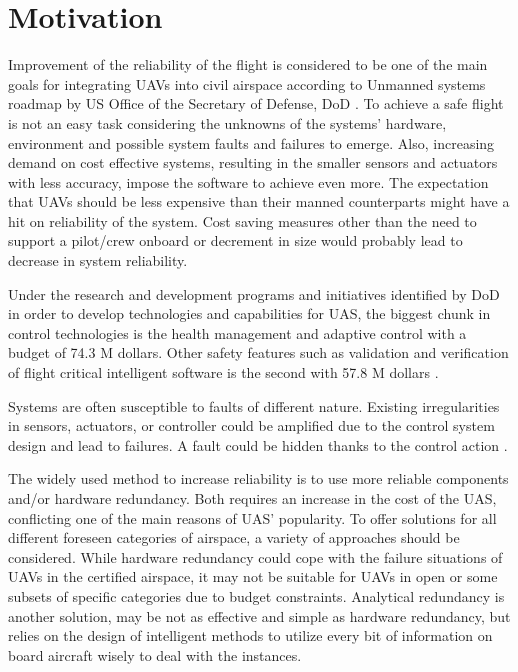 \section{Motivation}

Improvement of the reliability of the flight is considered to be one of the main goals for integrating UAVs into civil airspace according to Unmanned systems roadmap by US Office of the Secretary of Defense, DoD \cite{UnmannedSystemsRoadmapDoD}. 
To achieve a safe flight is not an easy task considering the unknowns of the systems' hardware, environment and possible system faults and failures to emerge. 
Also, increasing demand on cost effective systems, resulting in the smaller sensors and actuators with less accuracy, impose the software to achieve even more. 
The expectation that UAVs should be less expensive than their manned counterparts might have a hit on reliability of the system. Cost saving measures other than the need to support a pilot/crew onboard or decrement in size would probably lead to decrease in system reliability.

Under the research and development programs and initiatives identified by DoD in order to develop technologies and capabilities for UAS, the biggest chunk in control technologies is the health management and adaptive control with a budget of 74.3 M dollars. 
Other safety features such as validation and verification of flight critical intelligent software is the second with 57.8 M dollars \cite{UnmannedSystemsRoadmapDoD}. 

Systems are often susceptible to faults of different nature. Existing irregularities in sensors, actuators, or controller could be amplified due to the control system design and lead to failures. A fault could be hidden thanks to the control action \cite{ducard2009fault}.

The widely used method to increase reliability is to use more reliable components and/or hardware redundancy. Both requires an increase in the cost of the UAS, conflicting one of the main reasons of UAS' popularity\cite{angelov2012sense}. To offer solutions for all different foreseen categories of airspace, a variety of approaches should be considered. While hardware redundancy could cope with the failure situations of UAVs in the certified airspace, it may not be suitable for UAVs in open or some subsets of specific categories due to budget constraints. Analytical redundancy is another solution, may be not as effective and simple as hardware redundancy, but relies on the design of intelligent methods to utilize every bit of information on board aircraft wisely to deal with the instances.  

